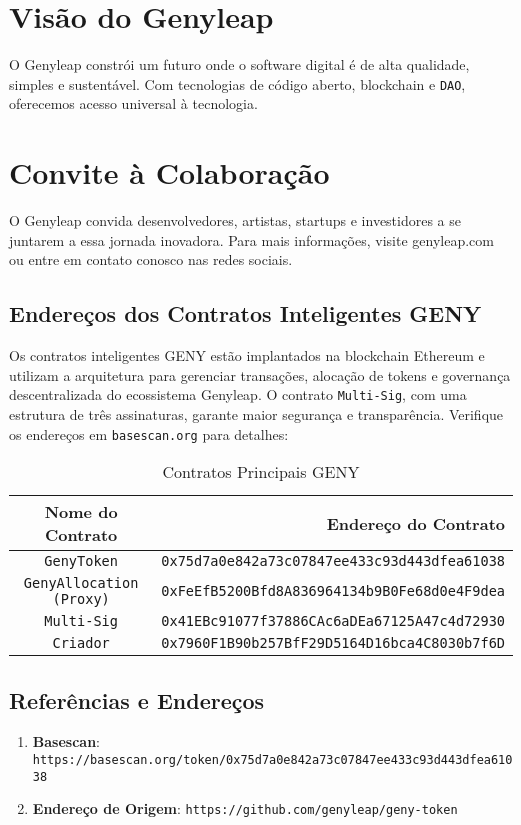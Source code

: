 \documentclass[a4paper,12pt,openany]{book}
\begin{document}
\chapter{Visão do Genyleap}
O Genyleap constrói um futuro onde o software digital é de alta qualidade, simples e sustentável. Com tecnologias de código aberto, blockchain e \texttt{DAO}, oferecemos acesso universal à tecnologia.

\chapter{Convite à Colaboração}
O Genyleap convida desenvolvedores, artistas, startups e investidores a se juntarem a essa jornada inovadora. Para mais informações, visite genyleap.com ou entre em contato conosco nas redes sociais.

\section*{Endereços dos Contratos Inteligentes GENY}
Os contratos inteligentes GENY estão implantados na blockchain Ethereum e utilizam a arquitetura  para gerenciar transações, alocação de tokens e governança descentralizada do ecossistema Genyleap. O contrato \texttt{Multi-Sig}, com uma estrutura de três assinaturas, garante maior segurança e transparência. Verifique os endereços em \texttt{basescan.org} para detalhes:

\begin{table}[h]
\centering
\caption*{Contratos Principais GENY}
\small
\begin{tabular}{c r}
\hline
\textbf{Nome do Contrato} & \textbf{Endereço do Contrato} \\
\hline
\texttt{GenyToken} & {\texttt{0x75d7a0e842a73c07847ee433c93d443dfea61038}} \\
\texttt{GenyAllocation (Proxy)} & {\texttt{0xFeEfB5200Bfd8A836964134b9B0Fe68d0e4F9dea}} \\
\texttt{Multi-Sig} & {\texttt{0x41EBc91077f37886CAc6aDEa67125A47c4d72930}} \\
\texttt{Criador} & {\texttt{0x7960F1B90b257BfF29D5164D16bca4C8030b7f6D}} \\
\hline
\end{tabular}
\end{table}

\section*{Referências e Endereços}

\begin{enumerate}
    \item \textbf{Basescan}: \texttt{https://basescan.org/token/0x75d7a0e842a73c07847ee433c93d443dfea61038}
    \item \textbf{Endereço de Origem}: \texttt{https://github.com/genyleap/geny-token}
\end{enumerate}
\end{document}
